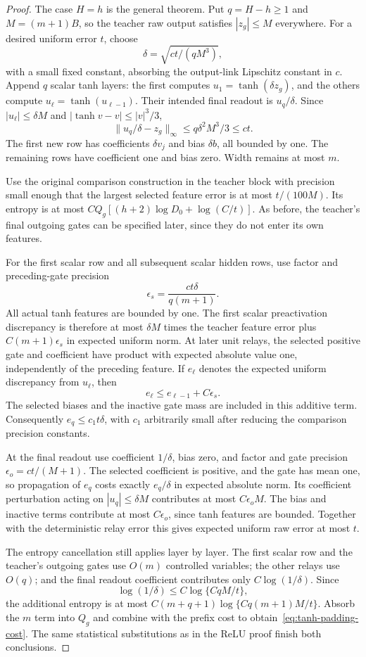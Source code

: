 \begin{proof}
The case $H=h$ is the general theorem. Put $q=H-h\ge1$ and $M=(m+1)B$, so the teacher raw output satisfies $|z_g|\le M$ everywhere. For a desired uniform error $t$, choose
\[
 \delta=\sqrt{ct/(qM^3)},
\]
with a small fixed constant, absorbing the output-link Lipschitz constant in $c$. Append $q$ scalar tanh layers: the first computes $u_1=\tanh(\delta z_g)$, and the others compute $u_\ell=\tanh(u_{\ell-1})$. Their intended final readout is $u_q/\delta$. Since $|u_\ell|\le\delta M$ and $|\tanh v-v|\le |v|^3/3$,
\[
 \|u_q/\delta-z_g\|_\infty\le q\delta^2M^3/3\le ct.
\]
The first new row has coefficients $\delta v_j$ and bias $\delta b$, all bounded by one. The remaining rows have coefficient one and bias zero. Width remains at most $m$.

Use the original comparison construction in the teacher block with precision small enough that the largest selected feature error is at most $t/(100M)$. Its entropy is at most
$CQ_g[(h+2)\log D_0+\log(C/t)]$. As before, the teacher's final outgoing gates can be specified later, since they do not enter its own features.

For the first scalar row and all subsequent scalar hidden rows, use factor and preceding-gate precision
\[
 \epsilon_s=\frac{ct\delta}{q(m+1)}.
\]
All actual tanh features are bounded by one. The first scalar preactivation discrepancy is therefore at most
$\delta M$ times the teacher feature error plus $C(m+1)\epsilon_s$ in expected uniform norm. At later unit relays, the selected positive gate and coefficient have product with expected absolute value one, independently of the preceding feature. If $e_\ell$ denotes the expected uniform discrepancy from $u_\ell$, then
\[
 e_\ell\le e_{\ell-1}+C\epsilon_s.
\]
The selected biases and the inactive gate mass are included in this additive term. Consequently $e_q\le c_1t\delta$, with $c_1$ arbitrarily small after reducing the comparison precision constants.

At the final readout use coefficient $1/\delta$, bias zero, and factor and gate precision $\epsilon_o=ct/(M+1)$. The selected coefficient is positive, and the gate has mean one, so propagation of $e_q$ costs exactly $e_q/\delta$ in expected absolute norm. Its coefficient perturbation acting on $|u_q|\le\delta M$ contributes at most $C\epsilon_oM$. The bias and inactive terms contribute at most $C\epsilon_o$, since tanh features are bounded. Together with the deterministic relay error this gives expected uniform raw error at most $t$.

The entropy cancellation still applies layer by layer. The first scalar row and the teacher's outgoing gates use $O(m)$ controlled variables; the other relays use $O(q)$; and the final readout coefficient contributes only $C\log(1/\delta)$. Since
\[
 \log(1/\delta)\le C\log\{CqM/t\},
\]
the additional entropy is at most
$C(m+q+1)\log\{Cq(m+1)M/t\}$.
Absorb the $m$ term into $Q_g$ and combine with the prefix cost to obtain~\eqref{eq:tanh-padding-cost}. The same statistical substitutions as in the ReLU proof finish both conclusions.
\end{proof}
